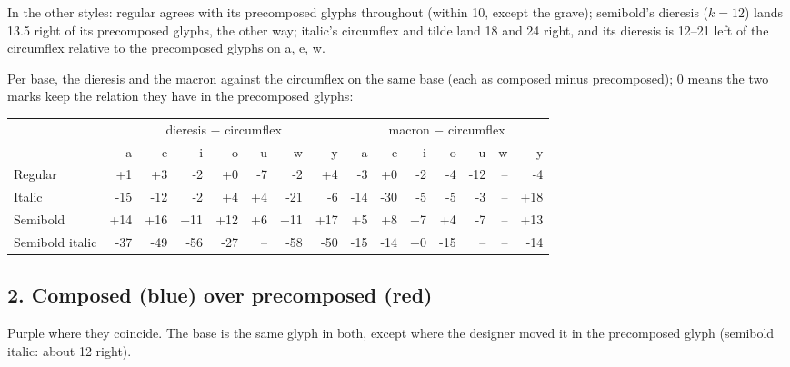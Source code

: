 \documentclass[10pt]{article}
\begin{document}
In the other styles: regular agrees with its precomposed glyphs throughout (within 10, except the grave);
semibold's dieresis ($k = 12$) lands 13.5 right of its precomposed glyphs, the other way;
italic's circumflex and tilde land 18 and 24 right, and its dieresis is 12--21 left of the circumflex relative to the precomposed glyphs on a, e, w.

\medskip
Per base, the dieresis and the macron against the circumflex on the same base (each as composed minus precomposed);
0 means the two marks keep the relation they have in the precomposed glyphs:

\medskip
{\small \begin{tabular}{@{}lrrrrrrrrrrrrrr@{}}
 & \multicolumn{7}{c}{dieresis $-$ circumflex} & \multicolumn{7}{c}{macron $-$ circumflex}\\
 & a & e & i & o & u & w & y & a & e & i & o & u & w & y\\\hline
Regular & +1 & +3 & -2 & +0 & -7 & -2 & +4 & -3 & +0 & -2 & -4 & -12 & -- & -4\\
Italic & -15 & -12 & -2 & +4 & +4 & -21 & -6 & -14 & -30 & -5 & -5 & -3 & -- & +18\\
Semibold & +14 & +16 & +11 & +12 & +6 & +11 & +17 & +5 & +8 & +7 & +4 & -7 & -- & +13\\
Semibold italic & -37 & -49 & -56 & -27 & -- & -58 & -50 & -15 & -14 & +0 & -15 & -- & -- & -14\\
\end{tabular}}

\clearpage
\subsection*{2. Composed (blue) over precomposed (red)}
Purple where they coincide. The base is the same glyph in both, except where the designer moved it in the precomposed glyph (semibold italic: about 12 right).
\end{document}
